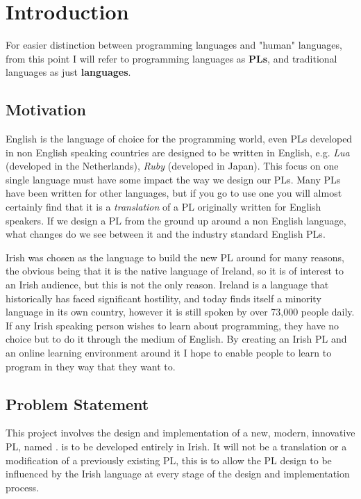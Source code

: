 \chapter{Introduction}
For easier distinction between programming languages and "human" languages, from this point I will refer to programming languages as \textbf{PLs}, and traditional languages as just \textbf{languages}.

\section{Motivation}
English is the language of choice for the programming world, even PLs developed in non English speaking countries are designed to be written in English, e.g. \emph{Lua} (developed in the Netherlands), \emph{Ruby} (developed in Japan). This focus on one single language must have some impact the way we design our PLs. Many PLs have been written for other languages, but if you go to use one you will almost certainly find that it is a \emph{translation} of a PL originally written for English speakers\cite{wikipllist}. If we design a PL from the ground up around a non English language, what changes do we see between it and the industry standard English PLs.

Irish was chosen as the language to build the new PL around for many reasons, the obvious being that it is the native language of Ireland, so it is of interest to an Irish audience, but this is not the only reason. Ireland is a language that historically has faced significant hostility, and today finds itself a minority language in its own country, however it is still spoken by over 73,000 people daily\cite{csoirish}. If any Irish speaking person wishes to learn about programming, they have no choice but to do it through the medium of English. By creating an Irish PL and an online learning environment around it I hope to enable people to learn to program in they way that they want to.

\section{Problem Statement}
This project involves the design and implementation of a new, modern, innovative PL, named \Setanta{}. \Setanta{} is to be developed entirely in Irish. It will not be a translation or a modification of a previously existing PL, this is to allow the PL design to be influenced by the Irish language at every stage of the design and implementation process.

